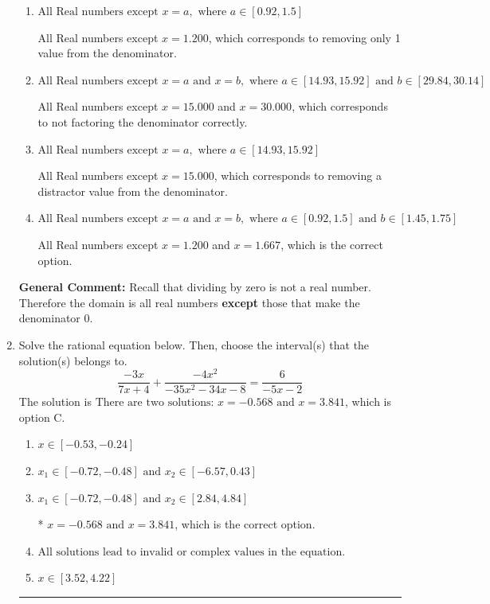 \documentclass{extbook}[14pt]
\newcommand{\litem}[1]{\item #1

\rule{\textwidth}{0.4pt}}
\begin{document}
\begin{enumerate}
{\begin{enumerate}[label=\Alph*.]
This corresponds to thinking the denominator has complex roots or that rational functions have a domain of all Real numbers.
\item \( \text{All Real numbers except } x = a, \text{ where } a \in [0.92, 1.5] \)

All Real numbers except $x = 1.200$, which corresponds to removing only 1 value from the denominator.
\item \( \text{All Real numbers except } x = a \text{ and } x = b, \text{ where } a \in [14.93, 15.92] \text{ and } b \in [29.84, 30.14] \)

All Real numbers except $x = 15.000$ and $x = 30.000$, which corresponds to not factoring the denominator correctly.
\item \( \text{All Real numbers except } x = a, \text{ where } a \in [14.93, 15.92] \)

All Real numbers except $x = 15.000$, which corresponds to removing a distractor value from the denominator.
\item \( \text{All Real numbers except } x = a \text{ and } x = b, \text{ where } a \in [0.92, 1.5] \text{ and } b \in [1.45, 1.75] \)

All Real numbers except $x = 1.200$ and $x = 1.667$, which is the correct option.
\end{enumerate}

\textbf{General Comment:} Recall that dividing by zero is not a real number. Therefore the domain is all real numbers \textbf{except} those that make the denominator 0.
}
\litem{
Solve the rational equation below. Then, choose the interval(s) that the solution(s) belongs to.
\[ \frac{-3x}{7x + 4} + \frac{-4x^{2}}{-35x^{2} -34 x -8} = \frac{6}{-5x -2} \]The solution is \( \text{There are two solutions: } x = -0.568 \text{ and } x = 3.841 \), which is option C.\begin{enumerate}[label=\Alph*.]
\item \( x \in [-0.53,-0.24] \)


\item \( x_1 \in [-0.72, -0.48] \text{ and } x_2 \in [-6.57,0.43] \)


\item \( x_1 \in [-0.72, -0.48] \text{ and } x_2 \in [2.84,4.84] \)

* $x = -0.568 \text{ and } x = 3.841$, which is the correct option.
\item \( \text{All solutions lead to invalid or complex values in the equation.} \)


\item \( x \in [3.52,4.22] \)



\end{enumerate}}
\end{enumerate}
\end{document}
